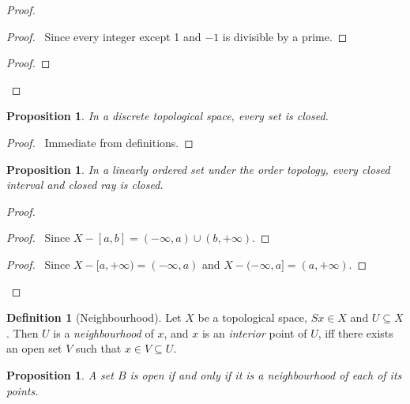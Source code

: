 \documentclass{book}
\let\qed\relax
\newtheorem{prop}[ax]{Proposition}
\theoremstyle{definition}
\newtheorem{df}[ax]{Definition}
\begin{document}
\begin{proof}
\begin{proof}
	\pf\ Since every integer except 1 and $-1$ is divisible by a prime.
\end{proof}
\begin{proof}
\end{proof}
\qed
\end{proof}

\begin{prop}
In a discrete topological space, every set is closed.
\end{prop}

\begin{proof}
\pf\ Immediate from definitions. \qed
\end{proof}

\begin{prop}
In a linearly ordered set under the order topology, every closed interval and closed ray is closed.
\end{prop}

\begin{proof}
\pf
{}
\begin{proof}
	\pf\ Since $X - [a,b] = (-\infty, a) \cup (b, +\infty)$.
\end{proof}
\begin{proof}
	\pf\ Since $X - [a,+\infty) = (-\infty,a)$ and $X - (-\infty,a] = (a,+\infty)$.
\end{proof}
\qed
\end{proof}

\begin{df}[Neighbourhood]
Let $X$ be a topological space, $Sx \in X$ and $U \subseteq X$. Then $U$ is a \emph{neighbourhood} of $x$, and $x$ is an \emph{interior} point of $U$, iff there exists an open set $V$ such that $x \in V \subseteq U$.
\end{df}

\begin{prop}
A set $B$ is open if and only if it is a neighbourhood of each of its points.
\end{prop}
\end{document}
